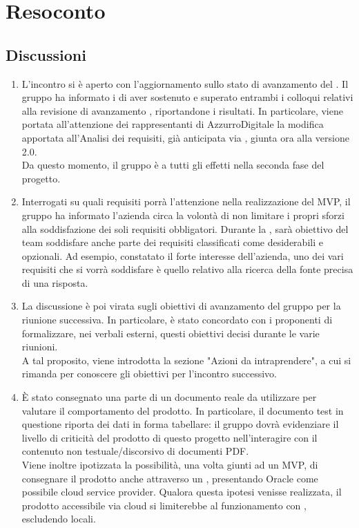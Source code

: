 \section{Resoconto} \label{sec:resoconto}
\subsection{Discussioni} \label{subsec:resdiscussione}
\begin{enumerate}
    \item L'incontro si è aperto con l'aggiornamento sullo stato di avanzamento del . Il gruppo ha informato i  di aver sostenuto e superato entrambi i colloqui relativi alla revisione di avanzamento , riportandone i risultati. In particolare, viene portata all'attenzione dei rappresentanti di AzzurroDigitale la modifica apportata all'Analisi dei requisiti, già anticipata via , giunta ora alla versione 2.0.\\Da questo momento, il gruppo è a tutti gli effetti nella seconda fase del progetto.
    \item Interrogati su quali requisiti porrà l'attenzione nella realizzazione del MVP, il gruppo ha informato l'azienda circa la volontà di non limitare i propri sforzi alla soddisfazione dei soli requisiti obbligatori. Durante la , sarà obiettivo del team soddisfare anche parte dei requisiti classificati come desiderabili e opzionali. Ad esempio, constatato il forte interesse dell'azienda, uno dei vari requisiti che si vorrà soddisfare è quello relativo alla ricerca della fonte precisa di una risposta.
    \item La discussione è poi virata sugli obiettivi di avanzamento del gruppo per la riunione successiva. In particolare, è stato concordato con i proponenti di formalizzare, nei verbali esterni, questi obiettivi decisi durante le varie riunioni.\\A tal proposito, viene introdotta la sezione "Azioni da intraprendere", a cui si rimanda per conoscere gli obiettivi per l'incontro successivo.
    \item È stato consegnato una parte di un documento reale da utilizzare per valutare il comportamento del prodotto. In particolare, il documento test in questione riporta dei dati in forma tabellare: il gruppo dovrà evidenziare il livello di criticità del prodotto di questo progetto nell'interagire con il contenuto non testuale/discorsivo di documenti PDF.\\Viene inoltre ipotizzata la possibilità, una volta giunti ad un MVP, di consegnare il prodotto anche attraverso un , presentando Oracle come possibile cloud service provider. Qualora questa ipotesi venisse realizzata, il prodotto accessibile via cloud si limiterebbe al funzionamento con , escludendo  locali.
\end{enumerate}

